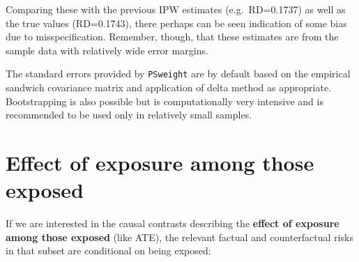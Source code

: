 \documentclass[
]{book}
\newenvironment{Shaded}{\begin{snugshade}}{\end{snugshade}}
\newcommand{\AttributeTok}[1]{\textcolor[rgb]{0.13,0.29,0.53}{#1}}
\newcommand{\CommentTok}[1]{\textcolor[rgb]{0.56,0.35,0.01}{\textit{#1}}}
\newcommand{\DecValTok}[1]{\textcolor[rgb]{0.00,0.00,0.81}{#1}}
\newcommand{\FunctionTok}[1]{\textcolor[rgb]{0.13,0.29,0.53}{\textbf{#1}}}
\newcommand{\NormalTok}[1]{#1}
\newcommand{\OtherTok}[1]{\textcolor[rgb]{0.56,0.35,0.01}{#1}}
\newcommand{\SpecialCharTok}[1]{\textcolor[rgb]{0.81,0.36,0.00}{\textbf{#1}}}
\newcommand{\StringTok}[1]{\textcolor[rgb]{0.31,0.60,0.02}{#1}}
\begin{document}
\begin{Shaded}
\end{Shaded}

Comparing these with the previous IPW estimates (e.g.~RD=0.1737) as well
as the true values (RD=0.1743), there perhaps can be seen indication of
some bias due to misspecification. Remember, though, that these
estimates are from the sample data with relatively wide error margins.

The standard errors provided by \texttt{PSweight} are by default based on the
empirical sandwich covariance matrix and application of delta method as
appropriate. Bootstrapping is also possible but is computationally very
intensive and is recommended to be used only in relatively small
samples.

\section{Effect of exposure among those exposed}\label{effect-of-exposure-among-those-exposed}

If we are interested in the causal contrasts describing the \textbf{effect of
exposure among those exposed} (like ATE), the relevant factual and
counterfactual risks in that subset are conditional on being exposed:
\end{document}
